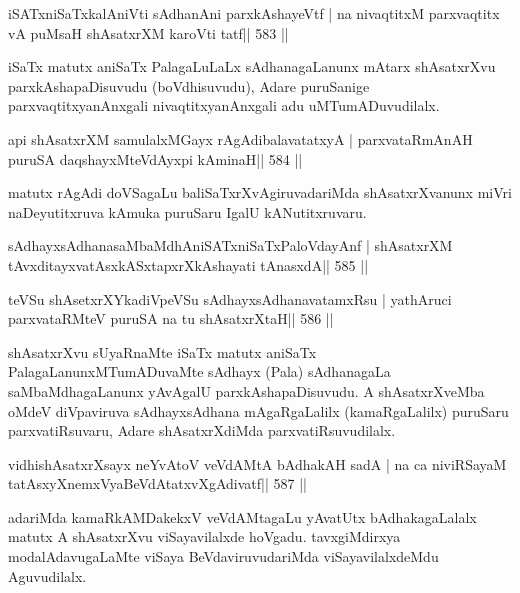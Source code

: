 \begin{shl}
iSATxniSaTxkalAniVti sAdhanAni parxkAshayeVtf |
na nivaqtitxM parxvaqtitx vA puMsaH shAsatxrXM karoVti tatf\hfill || 583 ||
\end{shl}

\begin{artha}
iSaTx matutx aniSaTx PalagaLuLaLx sAdhanagaLanunx mAtarx shAsatxrXvu parxkAshapaDisuvudu (boVdhisuvudu), Adare puruSanige parxvaqtitxyanAnxgali nivaqtitxyanAnxgali adu uMTumADuvudilalx.
\end{artha}



\begin{shl}
api shAsatxrXM samulalxMGayx rAgAdibalavatatxyA |
parxvataRmAnAH puruSA daqshayxMteV\s dAyxpi kAminaH\hfill || 584 ||
\end{shl}

\begin{artha}
matutx rAgAdi doVSagaLu baliSaTxrXvAgiruvadariMda shAsatxrXvanunx miVri naDeyutitxruva kAmuka puruSaru IgalU kANutitxruvaru.
\end{artha}

\begin{shl}
sAdhayxsAdhanasaMbaMdhAniSATxniSaTxPaloVdayAnf |
shAsatxrXM tAvxditayxvatAsxkASxtapxrXkAshayati tAnasxdA\hfill || 585 ||
\end{shl}

\begin{shl}
teVSu shAsetxrXYkadiVpeVSu sAdhayxsAdhanavatamxRsu |
yathAruci parxvataRMteV puruSA na tu shAsatxrXtaH\hfill || 586 ||
\end{shl}

\begin{artha}
shAsatxrXvu sUyaRnaMte iSaTx matutx aniSaTx PalagaLanunxMTumADuvaMte sAdhayx (Pala) sAdhanagaLa saMbaMdhagaLanunx yAvAgalU parxkAshapaDisuvudu. A shAsatxrXveMba oMdeV diVpaviruva sAdhayxsAdhana mAgaRgaLalilx (kamaRgaLalilx) puruSaru parxvatiRsuvaru, Adare shAsatxrXdiMda parxvatiRsuvudilalx.
\end{artha}

\begin{shl}
vidhishAsatxrXsayx neYvAtoV veVdAMtA bAdhakAH sadA |
na ca niviRSayaM tatAsxyXnemxVyaBeVdAtatxvXgAdivatf\hfill || 587 ||
\end{shl}

\begin{artha}
adariMda kamaRkAMDakekxV veVdAMtagaLu yAvatUtx bAdhakagaLalalx matutx A shAsatxrXvu viSayavilalxde hoVgadu. tavxgiMdirxya modalAdavugaLaMte viSaya BeVdaviruvudariMda viSayavilalxdeMdu Aguvudilalx.
\end{artha}

